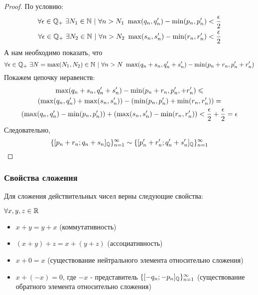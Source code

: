 \begin{proof}
    По условию:
    \begin{align*}
        \forall \epsilon \in \mathbb{Q}_+\ \exists N_1 \in \mathbb{N}\ |\ \forall n > N_1\ \max(q_n, q'_n) - \min(p_n, p'_n) < \frac{\epsilon}{2} \\
        \forall \epsilon \in \mathbb{Q}_+\ \exists N_2 \in \mathbb{N}\ |\ \forall n > N_2\ \max(s_n, s'_n) - \min(r_n, r'_n) < \frac{\epsilon}{2}
    \end{align*}
    А нам необходимо показать, что
    $$
        \forall \epsilon \in \mathbb{Q}_+\ \exists N = \max(N_1, N_2) \in \mathbb{N}\ |\ \forall n > N\ \max(q_n + s_n, q'_n + s'_n) - \min(p_n + r_n, p'_n + r'_n)
    $$
    Покажем цепочку неравенств:
    \begin{multline}
        \max(q_n + s_n, q'_n + s'_n) - \min(p_n + r_n, p'_n, + r'_n) \leqslant \\
        (\max(q_n, q'_n) + \max(s_n, s'_n)) - (\min(p_n, p'_n) + \min(r_n, r'_n)) = \\
        (\max(q_n, q'_n) - \min(p_n, p'_n)) + (\max(s_n, s'_n) - \min(r_n, r'_n)) < \frac{\epsilon}{2} + \frac{\epsilon}{2} = \epsilon
    \end{multline}
    Следовательно,
    $$
        \{[p_n + r_n; q_n + s_n]_{\mathbb{Q}}\}_{n = 1}^\infty \sim \{[p'_n + r'_n; q'_n + s'_n]_{\mathbb{Q}}\}_{n = 1}^\infty
    $$
\end{proof}

\subsubsection*{Свойства сложения}

Для сложения действительных чисел верны следующие свойства:

$\forall x, y, z \in \mathbb{R}$
\begin{itemize}
    \item $x + y = y + x$ (коммутативность)
    \item $(x + y) + z = x + (y + z)$ (ассоциативность)
    \item $x + 0 = x$ (существование нейтрального элемента относительно сложения)
    \item $x + (-x) = 0$, где $-x$ - представитель $\{[-q_n; -p_n]_{\mathbb{Q}}\}_{n = 1}^\infty$ (существование обратного элемента относительно сложения)
\end{itemize}